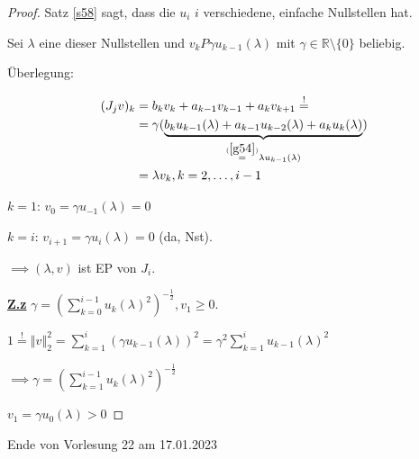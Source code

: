 \documentclass{book}
\def\R{\mathbb{R}}
\begin{document}
            \begin{proof}
                Satz \ref{s58} sagt, dass die $u_i$ $i$ verschiedene, einfache Nullstellen hat. 
                
                Sei $\lambda$ eine dieser Nullstellen und $v_kP\gamma u_{k-1}(\lambda)$ mit $\gamma\in\R\setminus\{0\}$ beliebig.
            
                Überlegung:
                 
                \begin{align*}
                    (J_jv)_{k} &= b_k v_k+ a_{k-1} v_{k-1}+a_{k} v_{k+1}\stackrel{!}{=}\\
                    &=\gamma(\underbrace{b_k u_{k-1}({\lambda}) + a_{k-1}u_{k-2}(\lambda)+a_ku_k(\lambda)}_{\stackrel{(\ref{g54})}{=}\lambda u_{k-1}(\lambda)}) \\
                    &= \lambda v_k, k=2,\dots, i-1
                \end{align*}

                $k=1$: $v_0=\gamma u_{-1}(\lambda)=0$

                $k=i$: $v_{i+1}=\gamma u_i(\lambda)=0$ (da, Nst).

                $\implies (\lambda, v)$ ist EP von $J_i$.

                \underline{\textbf{Z.z}} $\gamma=\left(\sum_{k=0}^{i-1}u_k(\lambda)^2\right)^{-\frac{1}{2}}, v_1\geq 0$.

                $1\stackrel{!}{=}\left\Vert v \right\Vert_2^2 = \sum_{k=1}^{i}(\gamma u_{k-1}(\lambda))^2 = \gamma^2 \sum_{k=1}^i u_{k-1}(\lambda)^2$

                $\implies \gamma=\left(\sum_{k=1}^{i-1}u_k(\lambda)^2\right)^{-\frac{1}{2}}$

                $v_1=\gamma u_0(\lambda)>0$

            \end{proof}

            \noindent
            \xrfill[0.7ex]{1pt}Ende von Vorlesung 22 am 17.01.2023\xrfill[0.7ex]{1pt}
            
\end{document}
